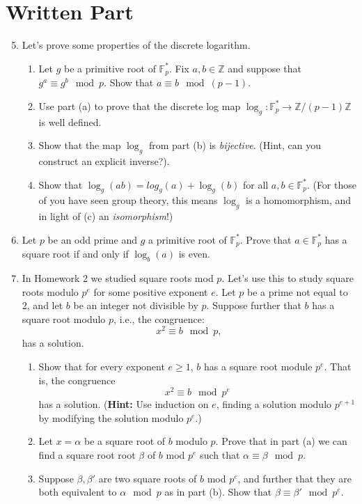 \documentclass[11pt]{article}
\newcommand{\bF}{\mathbb{F}}
\newcommand{\bZ}{\mathbb{Z}}
\begin{document}
\section*{Written Part}
\begin{enumerate}
  \setcounter{enumi}{4}
  \item{
  Let's prove some properties of the discrete logarithm.
  \begin{enumerate}
    \item{
    Let $g$ be a primitive root of $\bF_p^*$.  Fix $a,b\in\bZ$ and suppose that $g^a\equiv g^b\mod p$.  Show that $a\equiv b\mod(p-1)$.
    }
    \item{
    Use part (a) to prove that the discrete log map $\log_g:\bF_p^*\longrightarrow\bZ/(p-1)\bZ$ is well defined.
    }
    \item{
    Show that the map $\log_g$ from part (b) is \textit{bijective}.  (Hint, can you construct an explicit inverse?).
    }
    \item{
    Show that $\log_g(ab) = log_g(a)+\log_g(b)$ for all $a,b\in\bF_p^*$.  (For those of you have seen group theory, this means $\log_g$ is a homomorphism, and in light of (c) an \textit{isomorphism}!)
    }
  \end{enumerate}
  }
  \item{
  Let $p$ be an odd prime and $g$ a primitive root of $\bF_p^*$.  Prove that $a\in\bF_p^*$ has a square root if and only if $\log_b(a)$ is even.
  }
  \item{
  In Homework 2 we studied square roots mod $p$.  Let's use this to study square roots modulo $p^e$ for some positive exponent $e$.  Let $p$ be a prime not equal to 2, and let $b$ be an integer not divisible by $p$.  Suppose further that $b$ has a square root modulo $p$, i.e., the congruence:
  \[x^2\equiv b\mod p,\]
  has a solution.
  \begin{enumerate}
    \item{
    Show that for every exponent $e\ge 1$, $b$ has a square root module $p^e$.  That is, the congruence
    \[x^2\equiv b\mod p^e\]
    has a solution.  (\textbf{Hint:} Use induction on $e$, finding a solution modulo $p^{e+1}$ by modifying the solution modulo $p^e$.)
    }
    \item{
    Let $x=\alpha$ be a square root of $b$ modulo $p$.  Prove that in part (a) we can find a square root root $\beta$ of $b$ mod $p^e$ such that $\alpha\equiv\beta\mod p$.
    }
    \item{
    Suppose $\beta,\beta'$ are two square roots of $b$ mod $p^e$, and further that they are both equivalent to $\alpha\mod p$ as in part (b).  Show that $\beta\equiv\beta'\mod p^e$.
}
\end{enumerate}}
\end{enumerate}
\end{document}
